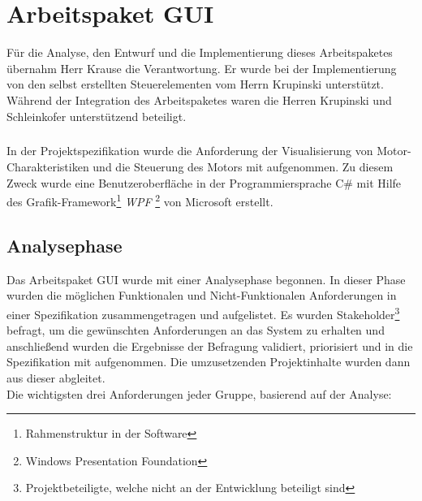 \graphicspath{{./gui/Bilder/}}

\chapter{Arbeitspaket GUI}
\label{GUI}
Für die Analyse, den Entwurf und die Implementierung dieses Arbeitspaketes übernahm Herr Krause die Verantwortung. Er wurde bei der Implementierung von den selbst erstellten Steuerelementen vom Herrn Krupinski unterstützt. Während der Integration des Arbeitspaketes waren die Herren Krupinski und Schleinkofer unterstützend beteiligt.
\paragraph{}
In der Projektspezifikation wurde die Anforderung der Visualisierung von Motor-Charakteristiken und die Steuerung des Motors mit aufgenommen. Zu diesem Zweck wurde eine Benutzeroberfläche in der Programmiersprache C\# mit Hilfe des Grafik-Framework\footnote{Rahmenstruktur in der Software} \textit{WPF} \footnote{Windows Presentation Foundation} von Microsoft erstellt.

\section{Analysephase}
Das Arbeitspaket GUI wurde mit einer Analysephase begonnen. In dieser Phase wurden die möglichen Funktionalen und Nicht-Funktionalen Anforderungen in einer Spezifikation zusammengetragen und aufgelistet. Es wurden Stakeholder\footnote{Projektbeteiligte, welche nicht an der Entwicklung beteiligt sind} befragt, um die gewünschten Anforderungen an das System zu erhalten und anschließend wurden die Ergebnisse der Befragung validiert, priorisiert und in die Spezifikation mit aufgenommen. Die umzusetzenden Projektinhalte wurden dann aus dieser abgleitet.\\
Die wichtigsten drei Anforderungen jeder Gruppe, basierend auf der Analyse: \\

